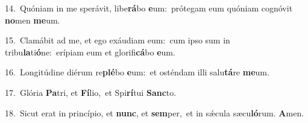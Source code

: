 {\numbfont\textcolor{\numbcolor}{14.}}~Quóniam in me sperávit, libe\-\textbf{rá}\-bo \textbf{e}\-um:~\star prótegam eum quóniam cognóvit \textbf{no}\-men \textbf{me}\-um.\par
{\numbfont\textcolor{\numbcolor}{15.}}~Clamábit ad me, et ego exáudiam eum:~\dagger cum ipso sum in tribu\-\textbf{la}\-ti\-\textbf{ó}\-ne:~\star erípiam eum et glorifi\-\textbf{cá}\-bo \textbf{e}\-um.\par
{\numbfont\textcolor{\numbcolor}{16.}}~Longitúdine diérum re\-\textbf{plé}\-bo \textbf{e}\-um:~\star et osténdam illi salu\-\textbf{tá}\-re \textbf{me}\-um.\par
{\numbfont\textcolor{\numbcolor}{17.}}~Glória \textbf{Pa}\-tri, et \textbf{Fí}\-lio,~\star et Spi\-\textbf{rí}\-tui \textbf{Sanc}\-to.\par
{\numbfont\textcolor{\numbcolor}{18.}}~Sicut erat in princípio, et \textbf{nunc}\-, et \textbf{sem}\-per,~\star et in sǽcula sæcu\-\textbf{ló}\-rum. \textbf{A}\-men.\par
